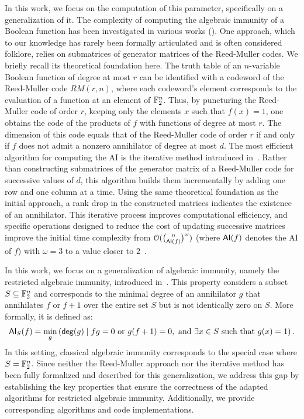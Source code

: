 \documentclass[11pt]{llncs}
\begin{document}


In this work, we focus on the computation of this parameter, specifically on a generalization of it.  
The complexity of computing the algebraic immunity of a Boolean function has been investigated in various works (\eg \cite{EC:CouMei03,EC:ACGKMR06,C:HawRos04,FSE:DidTil06}).  
One approach, which to our knowledge has rarely been formally articulated and is often considered folklore, relies on submatrices of generator matrices of the Reed-Muller codes. 
We briefly recall its theoretical foundation here. 
The truth table of an $n$-variable Boolean function of degree at most $r$ can be identified with a codeword of the Reed-Muller code $RM(r,n)$, where each codeword's element corresponds to the evaluation of a function at an element of $\mathbb{F}_2^n$.  
Thus, by puncturing the Reed-Muller code of order $r$, keeping only the elements $x$ such that $f(x) = 1$, one obtains the code of the products of $f$ with functions of degree at most $r$. 
The dimension of this code equals that of the Reed-Muller code of order $r$ if and only if $f$ does not admit a nonzero annihilator of degree at most $d$.  
%
The most efficient algorithm for computing the AI is the iterative method introduced in~\cite{EC:ACGKMR06}. 
Rather than constructing submatrices of the generator matrix of a Reed-Muller code for successive values of $d$, this algorithm builds them incrementally by adding one row and one column at a time. 
Using the same theoretical foundation as the initial approach, a rank drop in the constructed matrices indicates the existence of an annihilator. 
This iterative process improves computational efficiency, and specific operations designed to reduce the cost of updating successive matrices improve the initial time complexity from $\mathcal{O}(\binom{n}{\mathsf{AI}(f)}^\omega)$ (where $\mathsf{AI}(f)$ denotes the AI of $f$) with $\omega = 3$ to a value closer to $2$~\cite{EC:ACGKMR06,C:HawRos04}. 

In this work, we focus on a generalization of algebraic immunity, namely the restricted algebraic immunity, introduced in~\cite{TOSC:CarMeaRot17}.  
This property considers a subset $S \subseteq \mathbb{F}_2^n$ and corresponds to the minimal degree of an annihilator $g$ that annihilates $f$ or $f+1$ over the entire set $S$ but is not identically zero on $S$. 
More formally, it is defined as:
\[
\mathsf{AI}_S(f) = \min_g\left(\mathsf{deg}(g) \mid fg = 0 \text{ or } g(f+1) = 0, \text{ and } \exists x \in S \text{ such that } g(x) = 1 \right).
\]
In this setting, classical algebraic immunity corresponds to the special case where $S = \mathbb{F}_2^n$.  
Since neither the Reed-Muller approach nor the iterative method has been fully formalized and described for this generalization, we address this gap by establishing the key properties that ensure the correctness of the adapted algorithms for restricted algebraic immunity. Additionally, we provide corresponding algorithms and code implementations.  
\end{document}
